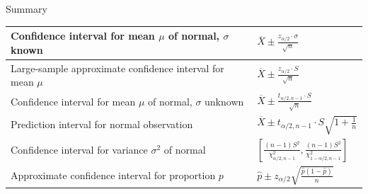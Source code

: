\documentclass[handout]{beamer}
\begin{document}
\begin{frame}{Summary}
\begin{center}
\small
\renewcommand*{\arraystretch}{1.5}
\begin{tabular}{p{4.5cm}|p{4cm}}
Confidence interval for mean $\mu$ of normal, $\sigma$ known & 
\vspace{-.25cm}$\displaystyle\overline X \pm \frac{z_{\alpha/2}\cdot\sigma}{\sqrt n}$ \\ \hline
Large-sample approximate confidence interval for mean $\mu$ & 
\vspace{-.25cm}$\displaystyle\overline{X} \pm \frac{z_{\alpha/2}\cdot S}{\sqrt{n}}$ \\ \hline
Confidence interval for mean $\mu$ of normal, $\sigma$ unknown & \vspace{-.25cm}$\displaystyle\overline{X} \pm \frac{t_{\alpha/2,n-1}\cdot S}{\sqrt{n}}$ \\ \hline
Prediction interval for normal observation & 
\vspace{-.25cm}$\displaystyle\overline X \pm t_{\alpha/2,n-1}\cdot S\sqrt{1+\frac1n}$ \\ \hline
Confidence interval for variance $\sigma^2$ of normal &
\vspace{-.35cm}$\displaystyle\left[\frac{(n-1)S^2}{\chi^2_{\alpha/2,n-1}}, \frac{(n-1)S^2}{\chi^2_{1-\alpha/2,n-1}}\right]$ \\ \hline
Approximate confidence interval for proportion $p$ &
\vspace{-.3cm}$\displaystyle\hat p \pm z_{\alpha/2}\sqrt{\frac{\hat p(1-\hat p)}n}$
\end{tabular}
\end{center}
\end{frame}

%


\end{document}
